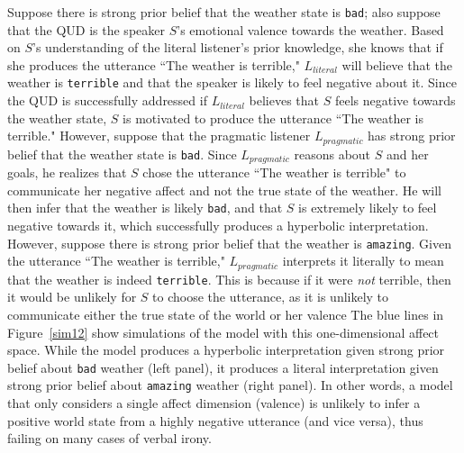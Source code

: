 \documentclass[10pt,letterpaper]{article}
\begin{document}
Suppose there is strong prior belief that the weather state is \texttt{bad}; also suppose that the QUD is the speaker $S$'s emotional valence towards the weather. Based on $S$'s understanding of the literal listener's prior knowledge, she knows that if she produces the utterance ``The weather is terrible," $L_{literal}$ will believe that the weather is \texttt{terrible} and that the speaker is likely to feel negative about it. Since the QUD is successfully addressed if $L_{literal}$ believes that $S$ feels negative towards the weather state, $S$ is motivated to produce the utterance ``The weather is terrible." However, suppose that the pragmatic listener $L_{pragmatic}$ has strong prior belief that the weather state is \texttt{bad}. Since $L_{pragmatic}$ reasons about $S$ and her goals, he realizes that $S$ chose the utterance ``The weather is terrible" to communicate her negative affect and not the true state of the weather. He will then infer that the weather is likely \texttt{bad}, and that $S$ is extremely likely to feel negative towards it, which successfully produces a hyperbolic interpretation. However, suppose there is strong prior belief that the weather is \texttt{amazing}. Given the utterance ``The weather is terrible," $L_{pragmatic}$ interprets it literally to mean that the weather is indeed \texttt{terrible}. This is because if it were \emph{not} terrible, then it would be unlikely for $S$ to choose the utterance, as it is unlikely to communicate either the true state of the world or her valence The blue lines in Figure~\ref{sim12} show simulations of the model with this one-dimensional affect space. While the model produces a hyperbolic interpretation given strong prior belief about \texttt{bad} weather (left panel), it produces a literal interpretation given strong prior belief about \texttt{amazing} weather (right panel). In other words, a model that only considers a single affect dimension (valence) is unlikely to infer a positive world state from a highly negative utterance (and vice versa), thus failing on many cases of verbal irony. 
\end{document}
